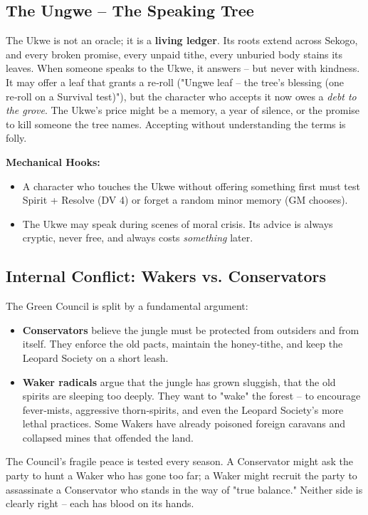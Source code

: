 \documentclass[11pt]{book}
\begin{document}
\subsection*{The Ungwe -- The Speaking Tree}
The Ukwe is not an oracle; it is a \textbf{living ledger}. Its roots extend across Sekogo, and every broken promise, every unpaid tithe, every unburied body stains its leaves. When someone speaks to the Ukwe, it answers -- but never with kindness. It may offer a leaf that grants a re‑roll ("Ungwe leaf -- the tree's blessing (one re‑roll on a Survival test)"), but the character who accepts it now owes a \textit{debt to the grove}. The Ukwe's price might be a memory, a year of silence, or the promise to kill someone the tree names. Accepting without understanding the terms is folly.

\textbf{Mechanical Hooks:}
\begin{itemize}
\item A character who touches the Ukwe without offering something first must test Spirit + Resolve (DV 4) or forget a random minor memory (GM chooses).
\item The Ukwe may speak during scenes of moral crisis. Its advice is always cryptic, never free, and always costs \textit{something} later.
\end{itemize}

\subsection*{Internal Conflict: Wakers vs. Conservators}
The Green Council is split by a fundamental argument:
\begin{itemize}
\item \textbf{Conservators} believe the jungle must be protected from outsiders and from itself. They enforce the old pacts, maintain the honey‑tithe, and keep the Leopard Society on a short leash.
\item \textbf{Waker radicals} argue that the jungle has grown sluggish, that the old spirits are sleeping too deeply. They want to "wake" the forest -- to encourage fever‑mists, aggressive thorn‑spirits, and even the Leopard Society's more lethal practices. Some Wakers have already poisoned foreign caravans and collapsed mines that offended the land.
\end{itemize}
The Council's fragile peace is tested every season. A Conservator might ask the party to hunt a Waker who has gone too far; a Waker might recruit the party to assassinate a Conservator who stands in the way of "true balance." Neither side is clearly right -- each has blood on its hands.
\end{document}
